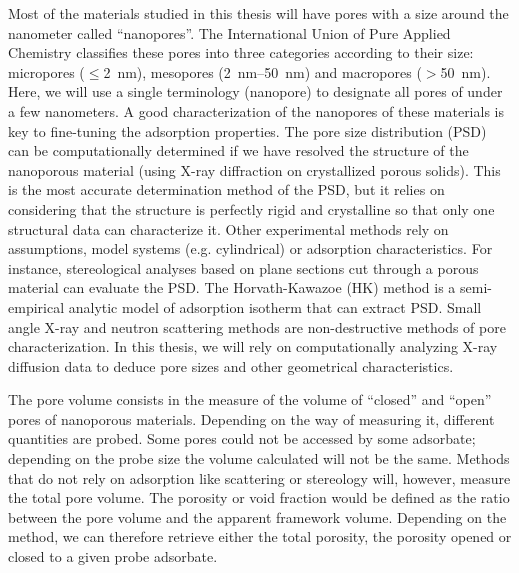 \documentclass[main.tex]{subfiles}
\begin{document}
Most of the materials studied in this thesis will have pores with a size around the nanometer called ``nanopores''. The International Union of Pure Applied Chemistry classifies these pores into three categories according to their size: micropores ($\leq$\SI{2}{\nano\meter}), mesopores (\SI{2}{\nano\meter}--\SI{50}{\nano\meter}) and macropores ($>$\SI{50}{\nano\meter}).\cite{Sing_1985} Here,
we will use a single terminology (nanopore) to designate all pores of under a few nanometers. A good characterization of the nanopores of these materials is key to fine-tuning the adsorption properties.\cite{Yan_2020} The pore size distribution (PSD) can be computationally determined if we have resolved the structure of the nanoporous material (using X-ray diffraction on crystallized porous solids). This is the most accurate determination method of the PSD, but it relies on considering that the structure is perfectly rigid and crystalline so that only one structural data can characterize it. Other experimental methods rely on assumptions, model systems (e.g. cylindrical) or adsorption characteristics. For instance, stereological analyses based on plane sections cut through a porous material can evaluate the PSD.\cite{Haynes_1973} The Horvath-Kawazoe (HK) method is a semi-empirical analytic model of adsorption isotherm that can extract PSD. Small angle X-ray and neutron scattering methods are non-destructive methods of pore characterization.\cite{Radlinski_2004} In this thesis, we will rely on computationally analyzing X-ray diffusion data to deduce pore sizes and other geometrical characteristics. 

The pore volume consists in the measure of the volume of ``closed'' and ``open'' pores of nanoporous materials. Depending on the way of measuring it, different quantities are probed. Some pores could not be accessed by some adsorbate; depending on the probe size the volume calculated will not be the same. Methods that do not rely on adsorption like scattering or stereology will, however, measure the total pore volume. The porosity or void fraction would be defined as the ratio between the pore volume and the apparent framework volume. Depending on the method, we can therefore retrieve either the total porosity, the porosity opened or closed to a given probe adsorbate. 
\end{document}
